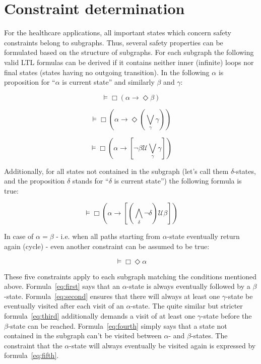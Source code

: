 \section{Constraint determination}
\label{sec:constraintdetermination}

For the healthcare applications, all important states which concern safety constraints belong to subgraphs. Thus, several safety properties can be formulated based on the structure of subgraphs.
For each subgraph the following valid LTL formulas can be derived if it contains neither inner (infinite) loops nor final states (states having no outgoing transition). In the following $\alpha$ is proposition for ``$\alpha$ is current state'' and similarly $\beta$ and $\gamma$:

\begin{equation} \label{eq:first}
  \models \Box (\alpha \rightarrow \Diamond \beta)
\end{equation}

\begin{equation} \label{eq:second}
  \models \Box (\alpha \rightarrow \Diamond (\bigvee_{\gamma} \gamma))
\end{equation}

\begin{equation} \label{eq:third}
  \models \Box (\alpha \rightarrow [\neg \beta \mathcal{U} \bigvee_{\gamma} \gamma])
\end{equation}

Additionally, for all states not contained in the subgraph (let's call them $\delta$-states, and the proposition $\delta$ stands for ``$\delta$ is current state'') the following formula is true: 

\begin{equation} \label{eq:fourth}
  \models \Box (\alpha \rightarrow [(\bigwedge_{\delta} \neg \delta) \mathcal{U} \beta])
\end{equation}

In case of $\alpha = \beta$ - i.e. when all paths starting from $\alpha$-state eventually return again (cycle) - even another constraint can be assumed to be true:

\begin{equation} \label{eq:fifth}
  \models \Box \Diamond \alpha
\end{equation}
 

These five constraints apply to each subgraph matching the conditions mentioned above. Formula~\ref{eq:first} says that an $\alpha$-state is always eventually followed by a $\beta$-state. Formula~\ref{eq:second} ensures that there will always at least one $\gamma$-state be eventually visited after each visit of an $\alpha$-state. The quite similar but stricter formula~\ref{eq:third} additionally demands a visit of at least one $\gamma$-state before the $\beta$-state can be reached. Formula~\ref{eq:fourth} simply says that a state not contained in the subgraph can't be visited between $\alpha$- and $\beta$-states. The constraint that the $\alpha$-state will always eventually be visited again is expressed by formula~\ref{eq:fifth}.

